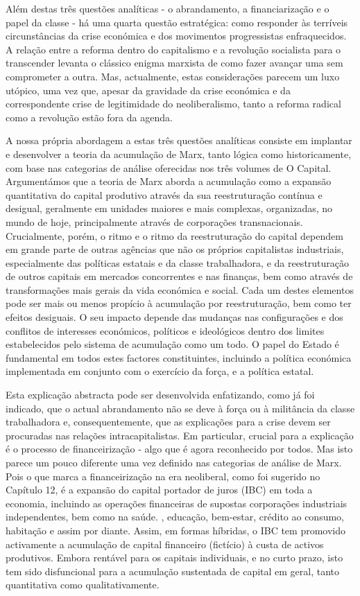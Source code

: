  \par 
Além destas três questões analíticas - o abrandamento, a financiarização e o papel da classe - há uma quarta questão estratégica: como responder às terríveis circunstâncias da crise económica e dos movimentos progressistas enfraquecidos. A relação entre a reforma dentro do capitalismo e a revolução socialista para o transcender levanta o clássico enigma marxista de como fazer avançar uma sem comprometer a outra. Mas, actualmente, estas considerações parecem um luxo utópico, uma vez que, apesar da gravidade da crise económica e da correspondente crise de legitimidade do neoliberalismo, tanto a reforma radical como a revolução estão fora da agenda.
 \par 
A nossa própria abordagem a estas três questões analíticas consiste em implantar e desenvolver a teoria da acumulação de Marx, tanto lógica como historicamente, com base nas categorias de análise oferecidas nos três volumes de O Capital. Argumentámos que a teoria de Marx aborda a acumulação como a expansão quantitativa do capital produtivo através da sua reestruturação contínua e desigual, geralmente em unidades maiores e mais complexas, organizadas, no mundo de hoje, principalmente através de corporações transnacionais. Crucialmente, porém, o ritmo e o ritmo da reestruturação do capital dependem em grande parte de outras agências que não os próprios capitalistas industriais, especialmente das políticas estatais e da classe trabalhadora, e da reestruturação de outros capitais em mercados concorrentes e nas finanças, bem como através de transformações mais gerais da vida económica e social. Cada um destes elementos pode ser mais ou menos propício à acumulação por reestruturação, bem como ter efeitos desiguais. O seu impacto depende das mudanças nas configurações e dos conflitos de interesses económicos, políticos e ideológicos dentro dos limites estabelecidos pelo sistema de acumulação como um todo. O papel do Estado é fundamental em todos estes factores constituintes, incluindo a política económica implementada em conjunto com o exercício da força, e a política estatal.
 \par 
Esta explicação abstracta pode ser desenvolvida enfatizando, como já foi indicado, que o actual abrandamento não se deve à força ou à militância da classe trabalhadora e, consequentemente, que as explicações para a crise devem ser procuradas nas relações intracapitalistas. Em particular, crucial para a explicação é o processo de financeirização - algo que é agora reconhecido por todos. Mas isto parece um pouco diferente uma vez definido nas categorias de análise de Marx. Pois o que marca a financeirização na era neoliberal, como foi sugerido no Capítulo 12, é a expansão do capital portador de juros (IBC) em toda a economia, incluindo as operações financeiras de supostas corporações industriais independentes, bem como na saúde. , educação, bem-estar, crédito ao consumo, habitação e assim por diante. Assim, em formas híbridas, o IBC tem promovido activamente a acumulação de capital financeiro (fictício) à custa de activos produtivos. Embora rentável para os capitais individuais, e no curto prazo, isto tem sido disfuncional para a acumulação sustentada de capital em geral, tanto quantitativa como qualitativamente.
